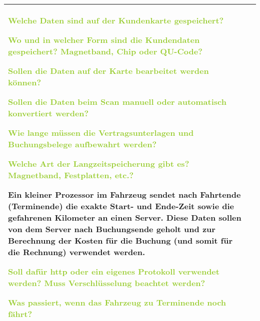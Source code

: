 \begin{tabular}{l | p{13cm}}
    \textcolor{NavyBlue}{}

    \textcolor{YellowGreen}{Welche Daten sind auf der Kundenkarte gespeichert?}

    \textcolor{NavyBlue}{}

    \textcolor{YellowGreen}{Wo und in welcher Form sind die Kundendaten gespeichert? Magnetband, Chip oder QU-Code?}

    \textcolor{NavyBlue}{}

    \textcolor{YellowGreen}{Sollen die Daten auf der Karte bearbeitet werden können?}

    \textcolor{NavyBlue}{}

    \textcolor{YellowGreen}{Sollen die Daten beim Scan manuell oder automatisch konvertiert werden?}

    \textcolor{NavyBlue}{}

    \textcolor{YellowGreen}{Wie lange müssen die Vertragsunterlagen und Buchungsbelege aufbewahrt werden?}

    \textcolor{NavyBlue}{}

    \textcolor{YellowGreen}{Welche Art der Langzeitspeicherung gibt es? Magnetband, Festplatten, etc.?}

    \textcolor{NavyBlue}{}

    Ein kleiner Prozessor im Fahrzeug sendet nach Fahrtende (Terminende) die exakte Start- und Ende-Zeit sowie die gefahrenen Kilometer an einen Server. Diese Daten sollen von dem Server nach Buchungsende geholt und zur Berechnung der Kosten für die Buchung (und somit für die Rechnung) verwendet werden. 
    
    \textcolor{YellowGreen}{Soll dafür http oder ein eigenes Protokoll verwendet werden? Muss Verschlüsselung beachtet werden?}

    \textcolor{NavyBlue}{}

    \textcolor{YellowGreen}{Was passiert, wenn das Fahrzeug zu Terminende noch fährt?}

    \textcolor{NavyBlue}{}
    \\
    \hline
\end{tabular}

